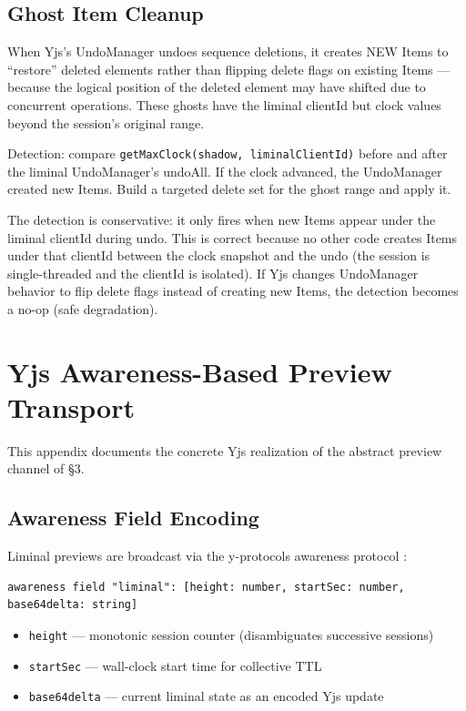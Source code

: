 \subsection{Ghost Item Cleanup}

When Yjs's UndoManager undoes sequence deletions, it creates NEW Items to ``restore'' deleted elements rather than flipping delete flags on existing Items --- because the logical position of the deleted element may have shifted due to concurrent operations. These ghosts have the liminal clientId but clock values beyond the session's original range.

Detection: compare \texttt{getMaxClock(shadow, liminalClientId)} before and after the liminal UndoManager's undoAll. If the clock advanced, the UndoManager created new Items. Build a targeted delete set for the ghost range and apply it.

The detection is conservative: it only fires when new Items appear under the liminal clientId during undo. This is correct because no other code creates Items under that clientId between the clock snapshot and the undo (the session is single-threaded and the clientId is isolated). If Yjs changes UndoManager behavior to flip delete flags instead of creating new Items, the detection becomes a no-op (safe degradation).

\section{Yjs Awareness-Based Preview Transport}

This appendix documents the concrete Yjs realization of the abstract preview channel of \S3.

\subsection{Awareness Field Encoding}

Liminal previews are broadcast via the y-protocols awareness protocol \cite{yjs:yprotocols}:

\begin{lstlisting}
awareness field "liminal": [height: number, startSec: number, base64delta: string]
\end{lstlisting}

\begin{itemize}
    \item \texttt{height} --- monotonic session counter (disambiguates successive sessions)
    \item \texttt{startSec} --- wall-clock start time for collective TTL
    \item \texttt{base64delta} --- current liminal state as an encoded Yjs update
\end{itemize}

